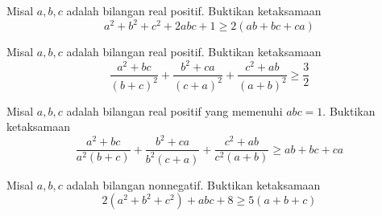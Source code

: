 \documentclass[11pt]{scrartcl}
\begin{document}
\begin{problem}
Misal $a, b, c$ adalah bilangan real positif. Buktikan ketaksamaan \[a^2 + b^2 + c^2 + 2abc + 1 \geq 2(ab + bc + ca)\]
\end{problem}

\begin{problem}
Misal $a, b, c$ adalah bilangan real positif. Buktikan ketaksamaan \[\dfrac{a^2 + bc}{(b + c)^2} + \dfrac{b^2 + ca}{(c + a)^2} + \dfrac{c^2 + ab}{(a + b)^2} \geq \dfrac{3}{2}\]
\end{problem}

\begin{problem}
Misal $a, b, c$ adalah bilangan real positif yang memenuhi $abc = 1$. Buktikan ketaksamaan \[\dfrac{a^2 + bc}{a^2(b + c)} + \dfrac{b^2 + ca}{b^2(c + a)} + \dfrac{c^2 + ab}{c^2(a + b)} \geq ab + bc + ca\]
\end{problem}

\begin{problem}
Misal $a, b, c$ adalah bilangan nonnegatif. Buktikan ketaksamaan \[2(a^2 + b^2 + c^2) + abc + 8 \geq 5(a + b + c)\]
\end{problem}
\end{document}
